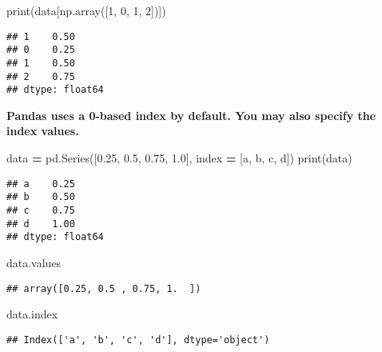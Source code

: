 \documentclass[
]{book}
\newenvironment{Shaded}{\begin{snugshade}}{\end{snugshade}}
\newcommand{\BuiltInTok}[1]{#1}
\newcommand{\DecValTok}[1]{\textcolor[rgb]{0.00,0.00,0.81}{#1}}
\newcommand{\FloatTok}[1]{\textcolor[rgb]{0.00,0.00,0.81}{#1}}
\newcommand{\NormalTok}[1]{#1}
\newcommand{\OperatorTok}[1]{\textcolor[rgb]{0.81,0.36,0.00}{\textbf{#1}}}
\newcommand{\StringTok}[1]{\textcolor[rgb]{0.31,0.60,0.02}{#1}}
\begin{document}
\begin{Shaded}
\begin{Highlighting}[]
\BuiltInTok{print}\NormalTok{(data[np.array([}\DecValTok{1}\NormalTok{, }\DecValTok{0}\NormalTok{, }\DecValTok{1}\NormalTok{, }\DecValTok{2}\NormalTok{])])}
\end{Highlighting}
\end{Shaded}

\begin{verbatim}
## 1    0.50
## 0    0.25
## 1    0.50
## 2    0.75
## dtype: float64
\end{verbatim}

\textbf{Pandas uses a 0-based index by default. You may also specify the index values.}

\begin{Shaded}
\begin{Highlighting}[]
\NormalTok{data }\OperatorTok{=}\NormalTok{ pd.Series([}\FloatTok{0.25}\NormalTok{, }\FloatTok{0.5}\NormalTok{, }\FloatTok{0.75}\NormalTok{, }\FloatTok{1.0}\NormalTok{], index }\OperatorTok{=}\NormalTok{ [}\StringTok{\textquotesingle{}a\textquotesingle{}}\NormalTok{, }\StringTok{\textquotesingle{}b\textquotesingle{}}\NormalTok{, }\StringTok{\textquotesingle{}c\textquotesingle{}}\NormalTok{, }\StringTok{\textquotesingle{}d\textquotesingle{}}\NormalTok{])}
\BuiltInTok{print}\NormalTok{(data)}
\end{Highlighting}
\end{Shaded}

\begin{verbatim}
## a    0.25
## b    0.50
## c    0.75
## d    1.00
## dtype: float64
\end{verbatim}

\begin{Shaded}
\begin{Highlighting}[]
\NormalTok{data.values}
\end{Highlighting}
\end{Shaded}

\begin{verbatim}
## array([0.25, 0.5 , 0.75, 1.  ])
\end{verbatim}

\begin{Shaded}
\begin{Highlighting}[]
\NormalTok{data.index}
\end{Highlighting}
\end{Shaded}

\begin{verbatim}
## Index(['a', 'b', 'c', 'd'], dtype='object')
\end{verbatim}
\end{document}
